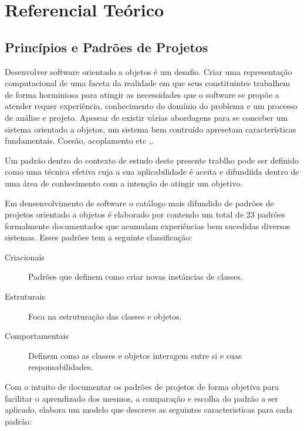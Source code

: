 \chapter{Referencial Teórico}

\section{Princípios e Padrões de Projetos}

Desenvolver software orientado a objetos é um desafio. Criar uma representação
computacional de uma faceta da realidade em que seus constituintes trabalhem de
forma horminiosa para atingir as necessidades que o software se propõe a
atender requer experiência, conhecimento do domínio do problema e um processo de
análise e projeto. Apesear de existir várias abordagens para se conceber um
sistema orientado a objetos\cite{evans2004ddd},\cite{gomma11} um sistema bem
contruído apresetam características fundamentais. Coesão, acoplamento etc
\cite{demarco},\cite{page-jones}.


Um padrão dentro do contexto de estudo deste presente trablho pode ser definido
como uma técnica efetiva cuja a sua aplicabilidade é aceita e difundiida dentro
de uma área de conhecimento com a intenção de atingir um
objetivo\cite{MetskerWake06}.

Em densenvolvimento de software o catálogo mais difundido de padrões de projetos
orientado a objetos é elaborado por  contendo um total de 23
padrões formalmente documentados que acumulam experiências bem sucedidas 
diversos sistemas. Esses padrões tem a seguinte classificação:

\begin{description}
\item[Criacionais] Padrões que definem como criar novas instâncias de classes.
\item[Estruturais] Foca na estruturação das classes e objetos.
\item[Comportamentais] Definem como as classes e objetos interagem entre si e
suas responsabilidades.
\end{description}

Com o intuito de documentar os padrões de projetos de forma objetiva para
facilitar o aprendizado dos mesmos, a comparação e escolha do padrão a ser
aplicado,  elabora um modelo que descreve as seguintes
caracteristicas para cada padrão:

